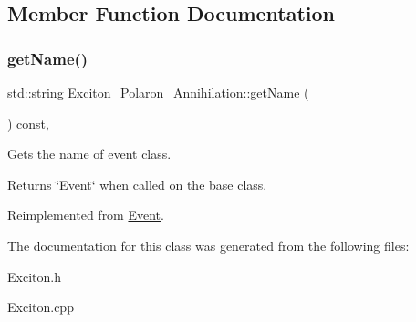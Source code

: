 \subsection{Member Function Documentation}
\mbox{\label{class_exciton___polaron___annihilation_aea3ae0f18ba7743d2183c2c5fbf4d4c4}} 
\subsubsection{\texorpdfstring{get\+Name()}{getName()}}
{\footnotesize\ttfamily std\+::string Exciton\+\_\+\+Polaron\+\_\+\+Annihilation\+::get\+Name (\begin{DoxyParamCaption}{ }\end{DoxyParamCaption}) const\hspace{0.3cm}{\ttfamily [inline]}, {\ttfamily [virtual]}}



Gets the name of event class. 

\begin{DoxyReturn}{Returns}
\char`\"{}\+Event\char`\"{} when called on the base class. 
\end{DoxyReturn}


Reimplemented from \hyperlink{class_event_a8c38a406d844d05eac1ef007bad2487f}{Event}.



The documentation for this class was generated from the following files\+:\begin{DoxyCompactItemize}
\item 
Exciton.\+h\item 
Exciton.\+cpp\end{DoxyCompactItemize}
